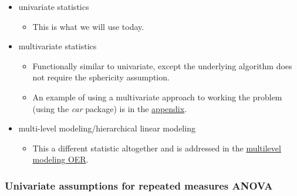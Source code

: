 \documentclass[
  11pt,
]{book}
\providecommand{\tightlist}{%
  \setlength{\itemsep}{0pt}\setlength{\parskip}{0pt}}
\begin{document}
\begin{itemize}
\tightlist
\item
  univariate statistics

  \begin{itemize}
  \tightlist
  \item
    This is what we will use today.
  \end{itemize}
\item
  multivariate statistics

  \begin{itemize}
  \tightlist
  \item
    Functionally similar to univariate, except the underlying algorithm does not require the sphericity assumption.
  \item
    An example of using a multivariate approach to working the problem (using the \emph{car} package) is in the \protect\hyperlink{RMmultiv}{appendix}.
  \end{itemize}
\item
  multi-level modeling/hierarchical linear modeling

  \begin{itemize}
  \tightlist
  \item
    This a different statistic altogether and is addressed in the \href{https://lhbikos.github.io/MultilevelModeling}{multilevel modeling OER}.
  \end{itemize}
\end{itemize}

\hypertarget{univariate-assumptions-for-repeated-measures-anova}{%
\subsubsection{Univariate assumptions for repeated measures ANOVA}\label{univariate-assumptions-for-repeated-measures-anova}}
\end{document}
